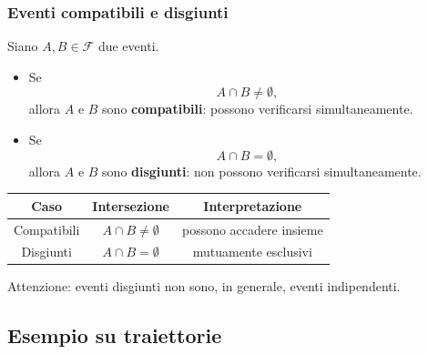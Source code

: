 \documentclass[handout]{beamer}%
\newenvironment{stepitemize}{\begin{itemize}[<+->]}{\end{itemize} }
\providecommand{\F}{\mathcal{F}}
\providecommand{\1}{\mathbf{1}}
\providecommand{\QTR}[2]{\csname #1\endcsname{#2}}
\begin{document}
\begin{frame}%
%

\frametitle{Eventi compatibili e disgiunti}%


Siano $A,B\in\F$ due eventi.

\medskip

\begin{stepitemize}
\item Se
\[
A\cap B\neq\emptyset,
\]
allora $A$ e $B$ sono \textbf{compatibili}: possono verificarsi simultaneamente.

\item Se
\[
A\cap B=\emptyset,
\]
allora $A$ e $B$ sono \textbf{disgiunti}: non possono verificarsi simultaneamente.
\end{stepitemize}

\medskip

\begin{center}%
\begin{tabular}
[c]{c|c|c}\hline
Caso & Intersezione & Interpretazione\\\hline
Compatibili & $A\cap B\neq\emptyset$ & possono accadere insieme\\
Disgiunti & $A\cap B=\emptyset$ & mutuamente esclusivi\\\hline
\end{tabular}

\end{center}

\medskip

\begin{center}
{\small Attenzione: eventi disgiunti non sono, in generale, eventi
indipendenti.}
\end{center}%

\transboxout
\end{frame}%




\subsection{Esempio su traiettorie}%
\end{document}

